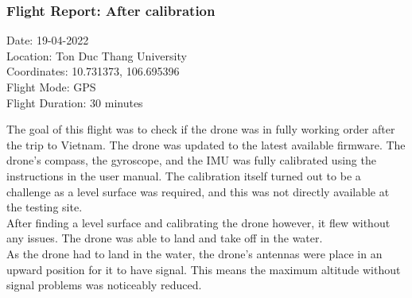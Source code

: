 \subsubsection{Flight Report: After calibration}
\begin{minipage}{1\textwidth}
	\begin{flushright}
		Date: 19-04-2022\\
		Location: Ton Duc Thang University\\
		Coordinates: 10.731373, 106.695396\\
		Flight Mode: \gls{GPS}\\
		Flight Duration: 30 minutes\\\vspace{5mm}
	\end{flushright}
\end{minipage}

The goal of this flight was to check if the drone was in fully working order after the trip to Vietnam. The drone was updated to the latest available firmware. The drone's compass, the gyroscope, and the \gls{IMU} was fully calibrated using the instructions in the user manual. \cite{splashdronemanual} The calibration itself turned out to be a challenge as a level surface was required, and this was not directly available at the testing site.\\

After finding a level surface and calibrating the drone however, it flew without any issues. The drone was able to land and take off in the water. \\

As the drone had to land in the water, the drone's antennas were place in an upward position for it to have signal. This means the maximum altitude without signal problems was noticeably reduced.

